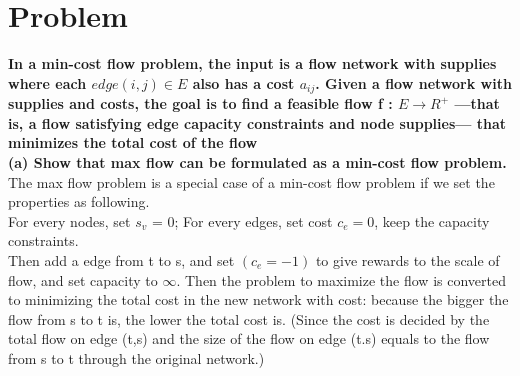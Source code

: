 \documentclass{article}
\begin{document}
\clearpage
\section{Problem \uppercase\expandafter{}}
\textbf{In a min-cost flow problem, the input is a flow network with supplies where each $edge (i, j) \in E$ also has a cost $a_{ij}$. Given a flow network with supplies and costs, the goal is to find a feasible
flow f : $E \rightarrow R^+$ —that is, a flow satisfying edge capacity constraints and node supplies—
that minimizes the total cost of the flow\\
(a) Show that max flow can be formulated as a min-cost flow problem.}\\
The max flow problem is a special case of a min-cost flow problem if we set the properties as following.\\
For every nodes, set $s_v$ = 0; For every edges, set cost $c_e = 0$, keep the capacity constraints.\\
Then add a edge from t to s, and set $(c_e=-1)$ to give rewards to the scale of flow, and set capacity to $\infty$.
Then the problem to maximize the flow is converted to minimizing the total cost in the new network with cost: because the bigger the flow from s to t is, the lower the total cost is. (Since the cost is decided by the total flow on edge (t,s) and the size of the flow on edge (t.s) equals to the flow from s to t through the original network.)\\
\end{document}
